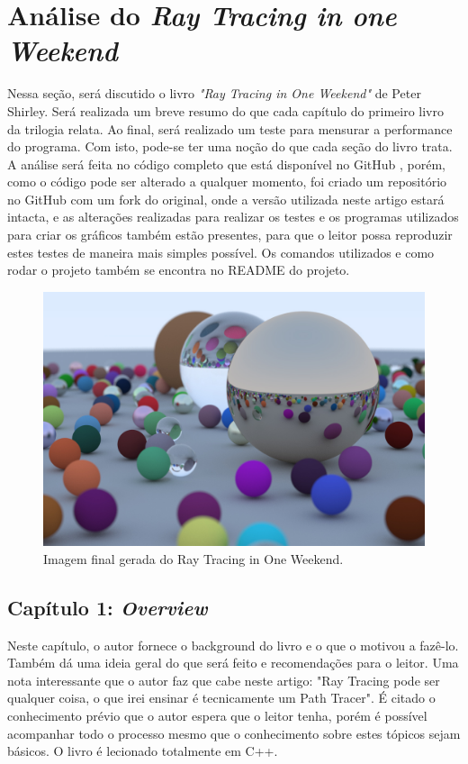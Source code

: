 \documentclass[journal]{IEEEtran}
\begin{document}
\section{Análise do \emph{Ray Tracing in one Weekend}}
Nessa seção, será discutido o livro \emph{"Ray Tracing in One Weekend"} de Peter Shirley. 
\cite{Shirley2020RTW1} Será realizada um breve resumo do que cada capítulo do primeiro
livro da trilogia relata. Ao final, será realizado um teste para mensurar a performance
do programa. Com isto, pode-se ter uma noção do que cada seção do livro trata. A análise 
será feita no código completo que está disponível no GitHub \cite{RayTracinOneWeekend-GitHub}, 
porém, como o código pode ser alterado a qualquer momento, foi criado um repositório no GitHub 
\cite{RayTracinOneWeekend-Artigo} com um fork
do original, onde a versão utilizada neste artigo estará intacta, e as alterações
realizadas para realizar os testes e os programas utilizados para criar os gráficos
também estão presentes, para que o leitor possa reproduzir estes testes de maneira
mais simples possível. Os comandos utilizados e como rodar o projeto também se 
encontra no README do projeto.

\begin{figure}[ht]
  \centering
  \includegraphics[width=\linewidth]{media/rtiow-final.jpg}
  \caption{Imagem final gerada do Ray Tracing in One Weekend.}
  \label{img_rtiow_final}
\end{figure}

\subsection*{Capítulo 1: \emph{Overview}}
Neste capítulo, o autor fornece o background do livro e o que o motivou a fazê-lo. 
Também dá uma ideia geral do que será feito e recomendações para o leitor. Uma nota
interessante que o autor faz que cabe neste artigo: "Ray Tracing pode ser qualquer coisa,
o que irei ensinar é tecnicamente um Path Tracer". É citado o conhecimento prévio que o
autor espera que o leitor tenha, porém é possível acompanhar todo o processo mesmo que
o conhecimento sobre estes tópicos sejam básicos. O livro é lecionado totalmente em C++.
\end{document}
